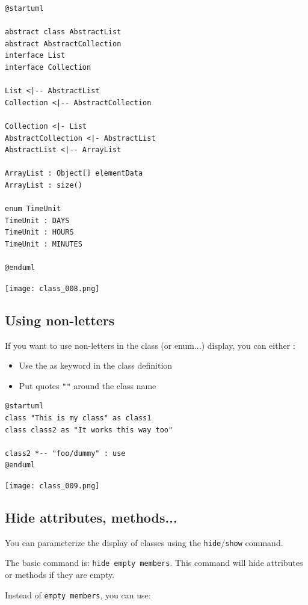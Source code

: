 \begin{lstlisting}
@startuml

abstract class AbstractList
abstract AbstractCollection
interface List
interface Collection

List <|-- AbstractList
Collection <|-- AbstractCollection

Collection <|- List
AbstractCollection <|- AbstractList
AbstractList <|-- ArrayList

ArrayList : Object[] elementData
ArrayList : size()

enum TimeUnit
TimeUnit : DAYS
TimeUnit : HOURS
TimeUnit : MINUTES

@enduml
\end{lstlisting}
\begin{center}
\texttt{[image: class\_008.png]}
\end{center}

\newpage \subsection{Using non-letters}

If you want to use non-letters in the class (or enum...) display, you can either :

\begin{itemize}
  \item Use the as keyword in the class definition
  \item Put quotes \texttt{""} around the class name
\end{itemize}

\begin{lstlisting}
@startuml
class "This is my class" as class1
class class2 as "It works this way too"

class2 *-- "foo/dummy" : use
@enduml
\end{lstlisting}
\begin{center}
\texttt{[image: class\_009.png]}
\end{center}


\newpage \subsection{Hide attributes, methods...}

\begin{description}
\item You can parameterize the display of classes using the
\texttt{hide}/\texttt{show} command.

\item The basic command is: \texttt{hide empty members}. This command will hide
attributes or methods if they are empty.

\item Instead of \texttt{empty members}, you can use:
\end{description}

